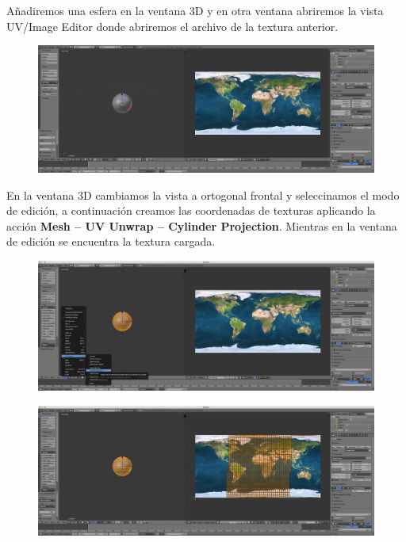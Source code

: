 \documentclass[10pt]{article}
\begin{document}
Añadiremos una esfera en la ventana 3D y en otra ventana abriremos la vista UV/Image Editor donde abriremos el archivo de la textura anterior. \\

\begin{figure}[H]
	\begin{center}
	 		\includegraphics[width = 1.00\textwidth]{Imagenes/p3-img2}
	\end{center} 
\end{figure}

En la ventana 3D cambiamos la vista a ortogonal frontal y seleccinamos el modo de edición, a continuación creamos las coordenadas de texturas aplicando la acción \textbf{Mesh -- UV Unwrap --  Cylinder Projection}. Mientras en la ventana de edición se encuentra la textura cargada. \\

\begin{figure}[H]
	\begin{center}
	 		\includegraphics[width = 1.00\textwidth]{Imagenes/p3-img3}
	\end{center} 
\end{figure}

\begin{figure}[H]
	\begin{center}
	 		\includegraphics[width = 1.00\textwidth]{Imagenes/p3-img4}
	\end{center} 
\end{figure}
\end{document}
